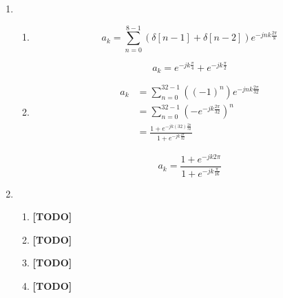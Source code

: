 \documentclass[]{article}
\begin{document}
\begin{enumerate}
\def\labelenumi{\arabic{enumi}.}
\setcounter{enumi}{4}
\item
  \begin{enumerate}
  \def\labelenumii{\alph{enumii}.}
  \item
    \[
        a_k = \sum_{n = 0}^{8 - 1} (\delta[n - 1] + \delta[n - 2]) e^{-j n k \frac{2\pi}{8}}
    \]

    \[
        \boxed{a_k = e^{-jk\frac{\pi}{4}} + e^{-jk\frac{\pi}{2}}}
    \]
  \item
    \begin{align*}
        a_k &= \sum_{n = 0}^{32 - 1} ((-1)^n ) e^{-j n k \frac{2\pi}{32}} \\
            &= \sum_{n = 0}^{32 - 1} (-e^{-j k \frac{2\pi}{32}})^n \\
            &= \frac{1 + e^{-jk(32) \frac{2\pi}{32} }}{1 + e^{-jk\frac{2\pi}{32}}}
    \end{align*}

    \[
        a_k = \boxed{\frac{1 + e^{-jk 2\pi}}{1 + e^{-jk\frac{\pi}{16}}}}
    \]
  \end{enumerate}
\item
  \begin{enumerate}
  \def\labelenumii{\alph{enumii}.}
  \item
    \textbf{{[}TODO{]}}
  \item
    \textbf{{[}TODO{]}}
  \item
    \textbf{{[}TODO{]}}
  \item
    \textbf{{[}TODO{]}}
  \end{enumerate}
\end{enumerate}
\end{document}
